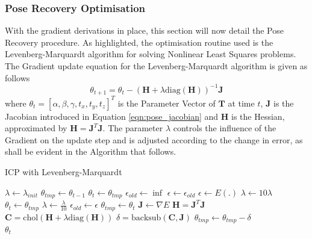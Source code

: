 \subsubsection{Pose Recovery Optimisation}
\label{subsub:moseg_static_camera_poserec_opt}
With the gradient derivations in place, this section will now detail the
Pose Recovery procedure. As highlighted, the optimisation routine used is the
Levenberg-Marquardt\cite{NumericalRecipes} algorithm for solving Nonlinear Least
Squares problems. The Gradient update equation for the Levenberg-Marquardt
algorithm is given as follows
\begin{equation}
  \label{eqn:lm_update}
  \theta_{t+1} = \theta_{t} - (\mathbf{H} + \lambda \text{diag}(
  \mathbf{H}))^{-1}
  \mathbf{J}
\end{equation}
where $\theta_{t} = [\alpha, \beta, \gamma, t_{x}, t_{y}, t_{z}]^{T}$ is the
Parameter Vector of $\mathbf{T}$ at time $t$, $\mathbf{J}$ is the Jacobian
introduced in Equation \ref{eqn:pose_jacobian} and $\mathbf{H}$ is the Hessian,
approximated by $\mathbf{H} = \mathbf{J}^{T}\mathbf{J}$. The parameter $\lambda$
controls the influence of the Gradient on the update step and is adjusted
according to the change in error, as shall be evident in the Algorithm
that follows.

{
  \centering
  \singlespacing
  \begin{minipage}{.7\linewidth}
    \begin{algorithm}[H]
      \label{alg:icp}
      \caption{ICP with Levenberg-Marquardt}
      \begin{algorithmic}[1]
        \State $\lambda \gets \lambda_{init}$
        \State $\theta_{tmp} \gets \theta_{t-1}$
        \State $\theta_{t} \gets \theta_{tmp}$
        \State $\epsilon_{old} \gets \inf$
        \State $\epsilon \gets \epsilon_{old}$
        \While{$\epsilon >= \tau$}
        \State $\epsilon \gets E(.)$
        \State $\lambda \gets 10\lambda$
        \State $\theta_{t} \gets \theta_{tmp}$
        \Else
        \State $\lambda \gets \frac{\lambda}{10}$
        \State $\epsilon_{old} \gets \epsilon$
        \State $\theta_{tmp} \gets \theta_{t}$
        \EndIf
        \State $\mathbf{J} \gets \nabla E$
        \State $\mathbf{H} = \mathbf{J}^{T}\mathbf{J}$
        \State $\mathbf{C} = \text{chol}(\mathbf{H} +
        \lambda \text{diag}(\mathbf{H}))$
        \State $\delta = \text{backsub}(\mathbf{C}, \mathbf{J})$
        \State $\theta_{tmp} \gets \theta_{tmp} - \delta$
        \EndWhile\\
        \Return $\theta_{t}$
        \EndProcedure
      \end{algorithmic}
    \end{algorithm}
  \end{minipage}
  \par
}


